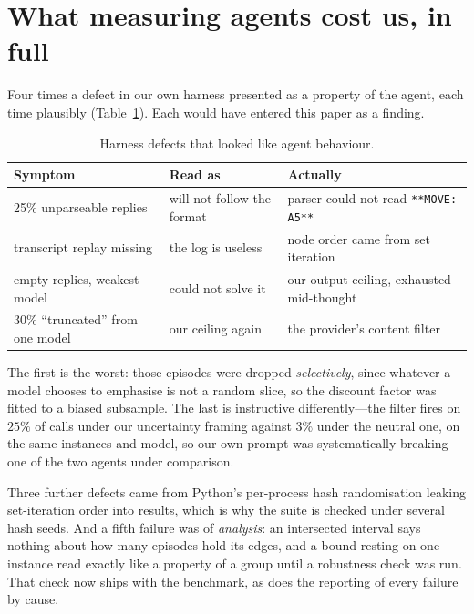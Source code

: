 \documentclass{article}
\begin{document}
\clearpage
\appendix

\section{What measuring agents cost us, in full}
\label{app:cost}

Four times a defect in our own harness presented as a property of the agent, each
time plausibly (Table~\ref{tab:defects}). Each would have entered this paper as a
finding.

\begin{table}[ht]
\caption{Harness defects that looked like agent behaviour.}
\label{tab:defects}
\centering
\small
\begin{tabular}{@{}lll@{}}
\toprule
Symptom & Read as & Actually \\
\midrule
25\% unparseable replies       & will not follow the format & parser could not read \verb|**MOVE: A5**| \\
transcript replay missing      & the log is useless         & node order came from set iteration \\
empty replies, weakest model   & could not solve it         & our output ceiling, exhausted mid-thought \\
30\% ``truncated'' from one model & our ceiling again       & the provider's content filter \\
\bottomrule
\end{tabular}
\end{table}

The first is the worst: those episodes were dropped \emph{selectively}, since
whatever a model chooses to emphasise is not a random slice, so the discount factor
was fitted to a biased subsample. The last is instructive differently---the filter
fires on $25\%$ of calls under our uncertainty framing against $3\%$ under the
neutral one, on the same instances and model, so our own prompt was systematically
breaking one of the two agents under comparison.

Three further defects came from Python's per-process hash randomisation leaking
set-iteration order into results, which is why the suite is checked under several
hash seeds. And a fifth failure was of \emph{analysis}: an intersected interval says
nothing about how many episodes hold its edges, and a bound resting on one instance
read exactly like a property of a group until a robustness check was run. That check
now ships with the benchmark, as does the reporting of every failure by cause.

\newpage

\end{document}
